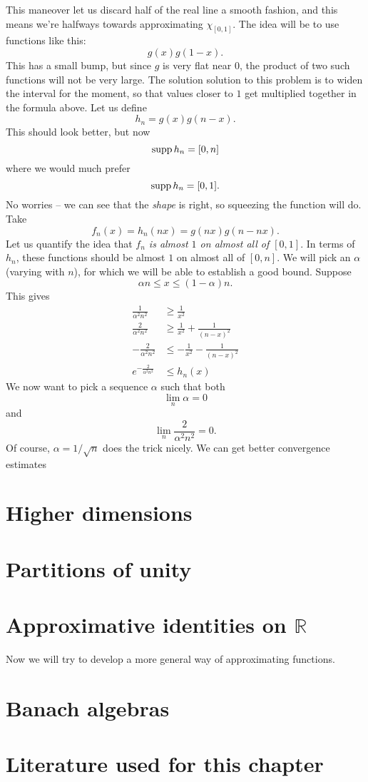 This maneover let us discard half of the real line a smooth fashion, and this means we're halfways towards approximating \( \chi_{[0,1]} \). The idea will be to use functions like this:
\[ 
    g(x)g(1-x).
\]
This has a small bump, but since \( g \) is very flat near \( 0 \), the product of two such functions will not be very large. The solution solution to this problem is to widen the interval for the moment, so that values closer to \( 1 \) get multiplied together in the formula above. Let us define
\[ 
    h_n = g(x)g(n-x).
\]
This should look better, but now
\[ 
    \operatorname{supp} h_n = [0,n] 
\]
where we would much prefer
\[ 
    \operatorname{supp} h_n = [0,1].
\]
No worries -- we can see that the \emph{shape} is right, so squeezing the function will do. Take
\[ 
    f_n(x) = h_n(nx) = g(nx)g(n - nx). 
\]
Let us quantify the idea that \emph{\( f_n \) is almost \( 1 \) on almost all of \( [0,1] \)}. In terms of \( h_n \), these functions should be almost \( 1 \) on almost all of \( [0,n] \). We will pick an \( \alpha \) (varying with \( n \)), for which we will be able to establish a good bound.
Suppose
\[ 
    \alpha n \leq x \leq (1 - \alpha) n.
\]
This gives
\begin{align*}
    \frac{1}{\alpha^2n^2} &\geq \frac{1}{x^2}  \\
    \frac{2}{\alpha^2n^2} &\geq \frac{1}{x^2} + \frac{1}{(n-x)^2} \\
    -\frac{2}{\alpha^2n^2} &\leq -\frac{1}{x^2} - \frac{1}{(n-x)^2} \\
    e^{-\frac{2}{\alpha^2n^2}} &\leq  h_n(x)
\end{align*}
We now want to pick a sequence \( \alpha \) such that both
\[ 
    \lim\limits_n \alpha = 0
\]
and
\[ 
    \lim\limits_n \frac{2}{\alpha^2n^2} = 0.
\]
Of course, \( \alpha = 1/\sqrt{n} \) does the trick nicely. We can get better convergence estimates

\section{Higher dimensions}

\section{Partitions of unity}


\section{Approximative identities on \(\mathbb{R}\)}
Now we will try to develop a more general way of approximating functions.

\section{Banach algebras}

\section{Literature used for this chapter}
